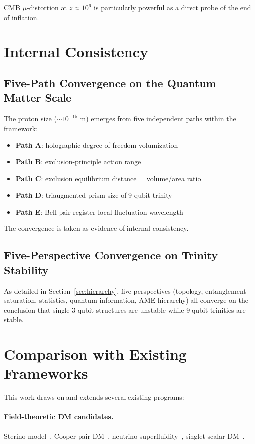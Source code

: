 \documentclass[11pt,a4paper]{article}
\begin{document}
CMB $\mu$-distortion at $z \approx 10^6$ is particularly powerful as a direct probe of the end of inflation.

\section{Internal Consistency}

\subsection{Five-Path Convergence on the Quantum Matter Scale}

The proton size ($\sim 10^{-15}$ m) emerges from five independent paths within the framework:
\begin{itemize}[leftmargin=*]
\item \textbf{Path A}: holographic degree-of-freedom volumization
\item \textbf{Path B}: exclusion-principle action range
\item \textbf{Path C}: exclusion equilibrium distance = volume/area ratio
\item \textbf{Path D}: triaugmented prism size of 9-qubit trinity
\item \textbf{Path E}: Bell-pair register local fluctuation wavelength
\end{itemize}

The convergence is taken as evidence of internal consistency.

\subsection{Five-Perspective Convergence on Trinity Stability}

As detailed in Section~\ref{sec:hierarchy}, five perspectives (topology, entanglement saturation, statistics, quantum information, AME hierarchy) all converge on the conclusion that single 3-qubit structures are unstable while 9-qubit trinities are stable.

\section{Comparison with Existing Frameworks}
\label{sec:related}

This work draws on and extends several existing programs:

\paragraph{Field-theoretic DM candidates.} Sterino model~\cite{Krolikowski2007}, Cooper-pair DM~\cite{Alexander2024}, neutrino superfluidity~\cite{Kapusta2004}, singlet scalar DM~\cite{Burgess2001}.
\end{document}
